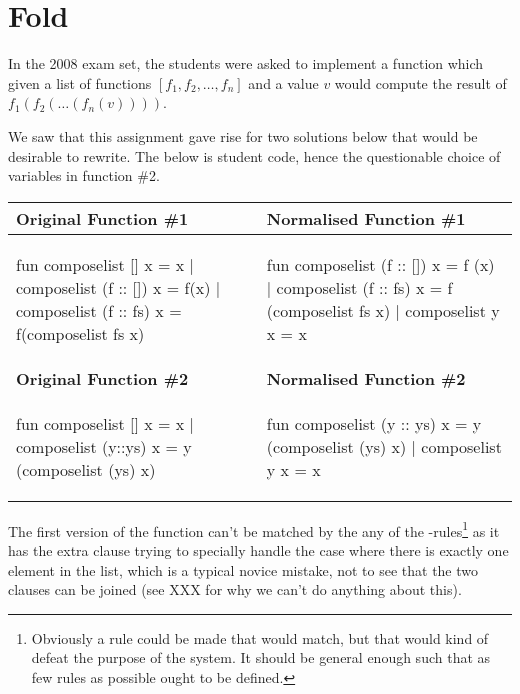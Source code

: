 \section{Fold}

\begin{example}
  In the 2008 exam set, the students were asked to implement a 
  function which given a list of functions $[f_1, f_2, \ldots, f_n]$ and a value
  $v$ would compute the result of $f_1(f_2(\ldots(f_n(v))))$.

  We saw that this assignment gave rise for two solutions below that would be
  desirable to rewrite. The below is student code, hence the questionable choice
  of variables in function \#2.

  \begin{center}
    \begin{tabular}{|l|l|}
      \hline
      \textbf{Original Function \#1}
      & 
      \textbf{Normalised Function \#1}
      \\\hline
\begin{sml}
fun composelist [] x = x 
  | composelist (f :: []) x = f(x) 
  | composelist (f :: fs) x = 
      f(composelist fs x)
\end{sml}
      &
\begin{sml}
fun composelist (f :: []) x = f (x)
  | composelist (f :: fs) x = 
      f (composelist fs x)
  | composelist y x = x        
\end{sml}
      \\\hline
      \textbf{Original Function \#2}
      &
      \textbf{Normalised Function \#2}
      \\\hline
\begin{sml}
fun composelist [] x = x 
  | composelist (y::ys) x = 
     y (composelist (ys) x)
\end{sml}
      &
\begin{sml}
fun composelist (y :: ys) x = 
      y (composelist (ys) x)
  | composelist y x = x
\end{sml}
      \\\hline
    \end{tabular}
  \end{center}

  \noindent
  The first version of the  function can't be matched by the
  any of the -rules\footnote{Obviously a rule could be made that would
    match, but that would kind of defeat the purpose of the system. It should be
    general enough such that as few rules as possible ought to be defined.} as
  it has the extra clause trying to specially handle the case where there is
  exactly one element in the list, which is a typical novice mistake, not to see
  that the two clauses can be joined (see XXX  for
  why we can't do anything about this).


\end{example}
